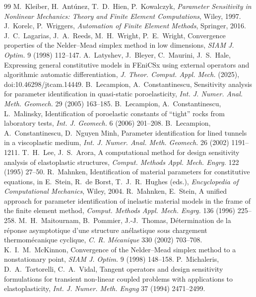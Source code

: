 \begin{chapterbib}{99}
 M.~Kleiber, H.~Ant\'unez, T.~D.~Hien, P.~Kowalczyk, \emph{Parameter Sensitivity in Nonlinear Mechanics: Theory and Finite Element Computations}, Wiley, 1997.
 J.~Korelc, P.~Wriggers, \emph{Automation of Finite Element Methods}, Springer, 2016.
 J.~C.~Lagarias, J.~A.~Reeds, M.~H.~Wright, P.~E.~Wright, Convergence properties of the Nelder--Mead simplex method in low dimensions, \emph{SIAM J. Optim.} 9 (1998) 112--147.
 A.~Latyshev, J.~Bleyer, C.~Maurini, J.~S.~Hale, Expressing general constitutive models in FEniCSx using external operators and algorithmic automatic differentiation, \emph{J. Theor. Comput. Appl. Mech.} (2025), doi:10.46298/jtcam.14449.
 B.~Lecampion, A.~Constantinescu, Sensitivity analysis for parameter identification in quasi-static poroelasticity, \emph{Int. J. Numer. Anal. Meth. Geomech.} 29 (2005) 163--185.
 B.~Lecampion, A.~Constantinescu, L.~Malinsky, Identification of poroelastic constants of ``tight'' rocks from laboratory tests, \emph{Int. J. Geomech.} 6 (2006) 201--208.
 B.~Lecampion, A.~Constantinescu, D.~Nguyen Minh, Parameter identification for lined tunnels in a viscoplastic medium, \emph{Int. J. Numer. Anal. Meth. Geomech.} 26 (2002) 1191--1211.
 T.~H.~Lee, J.~S.~Arora, A computational method for design sensitivity analysis of elastoplastic structures, \emph{Comput. Methods Appl. Mech. Engrg.} 122 (1995) 27--50.
 R.~Mahnken, Identification of material parameters for constitutive equations, in E.~Stein, R.~de Borst, T.~J.~R.~Hughes (eds.), \emph{Encyclopedia of Computational Mechanics}, Wiley, 2004.
 R.~Mahnken, E.~Stein, A unified approach for parameter identification of inelastic material models in the frame of the finite element method, \emph{Comput. Methods Appl. Mech. Engrg.} 136 (1996) 225--258.
 M.~H.~Maitournam, B.~Pommier, J.-J.~Thomas, D\'etermination de la r\'eponse asymptotique d'une structure an\'elastique sous chargement thermom\'ecanique cyclique, \emph{C. R. M\'ecanique} 330 (2002) 703--708.
 K.~I.~M.~McKinnon, Convergence of the Nelder--Mead simplex method to a nonstationary point, \emph{SIAM J. Optim.} 9 (1998) 148--158.
 P.~Michaleris, D.~A.~Tortorelli, C.~A.~Vidal, Tangent operators and design sensitivity formulations for transient non-linear coupled problems with applications to elastoplasticity, \emph{Int. J. Numer. Meth. Engng} 37 (1994) 2471--2499.

\end{chapterbib}
